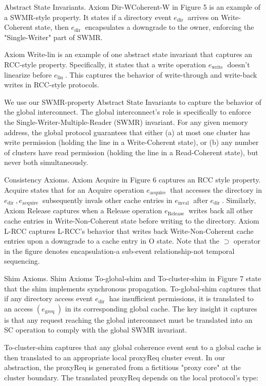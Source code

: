 \documentclass[10pt]{article}
\begin{document}
Abstract State Invariants. Axiom Dir-WCoherent-W in Figure 5 is an example of a SWMR-style property. It states if a directory event $e_{\text {dir }}$ arrives on Write-Coherent state, then $e_{\text {dir }}$ encapsulates a downgrade to the owner, enforcing the "Single-Writer" part of SWMR.

Axiom Write-lin is an example of one abstract state invariant that captures an RCC-style property. Specifically, it states that a write operation $e_{\text {write }}$ doesn't linearize before $e_{\text {lin }}$. This captures the behavior of write-through and write-back writes in RCC-style protocols.

We use our SWMR-property Abstract State Invariants to capture the behavior of the global interconnect. The global interconnect's role is specifically to enforce the Single-Writer-Multiple-Reader (SWMR) invariant. For any given memory address, the global protocol guarantees that either (a) at most one cluster has write permission (holding the line in a Write-Coherent state), or (b) any number of clusters have read permission (holding the line in a Read-Coherent state), but never both simultaneously.

Consistency Axioms. Axiom Acquire in Figure 6 captures an RCC style property. Acquire states that for an Acquire operation $e_{\text {acquire }}$ that accesses the directory in $e_{\text {dir }}, e_{\text {acquire }}$ subsequently invals other cache entries in $e_{\text {inval }}$ after $e_{\text {dir }}$. Similarly, Axiom Release captures when a Release operation $e_{\text {Release }}$ writes back all other cache entries in Write-Non-Coherent state before writing to the directory. Axiom L-RCC captures L-RCC's behavior that writes back Write-Non-Coherent cache entries upon a downgrade to a cache entry in O state. Note that the $\supset$ operator in the figure denotes encapsulation-a sub-event relationship-not temporal sequencing.

Shim Axioms. Shim Axioms To-global-shim and To-cluster-shim in Figure 7 state that the shim implements synchronous propagation. To-global-shim captures that if any directory access event $e_{\text {dir }}$ has insufficient permissions, it is translated to an access $\left(e_{\text {greq }}\right)$ in its corresponding global cache. The key insight it captures is that any request reaching the global interconnect must be translated into an SC operation to comply with the global SWMR invariant.

To-cluster-shim captures that any global coherence event sent to a global cache is then translated to an appropriate local proxyReq cluster event. In our abstraction, the proxyReq is generated from a fictitious "proxy core" at the cluster boundary. The translated proxyReq depends on the local protocol's type:
\end{document}
